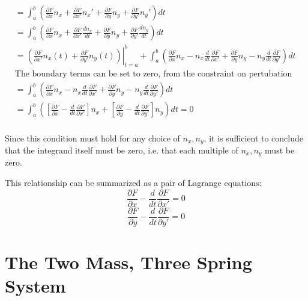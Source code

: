\documentclass[%
 amsmath,amssymb,
aps,
 fleqn,
 notitlepage,
]{revtex4-2}
\begin{document}
\begin{align*}
    &= \int_a^b \left(\frac{\partial F}{\partial x}n_x + \frac{\partial F}{\partial x'}n_x' + \frac{\partial F}{\partial y}n_y + \frac{\partial F}{\partial y'}n_y'\right)dt\\
    &= \int_a^b \left(\frac{\partial F}{\partial x}n_x + \frac{\partial F}{\partial x'}\frac{d n_x}{dt} + \frac{\partial F}{\partial y}n_y + \frac{\partial F}{\partial y'}\frac{d n_y}{dt}\right)dt\\
    &= \left.\left(\frac{\partial F}{\partial x'}n_x(t) + \frac{\partial F}{\partial y'}n_y(t)\right)\right|_{t=a}^b + \int_a^b \left(\frac{\partial F}{\partial x}n_x - n_x\frac{d}{dt}\frac{\partial F}{\partial x'} + \frac{\partial F}{\partial y}n_y - n_y\frac{d}{dt}\frac{\partial F}{\partial y'}\right)dt\\
    &\text{The boundary terms can be set to zero, from the constraint on pertubation vectors:}\\
    &= \int_a^b \left(\frac{\partial F}{\partial x}n_x - n_x\frac{d}{dt}\frac{\partial F}{\partial x'} + \frac{\partial F}{\partial y}n_y - n_y\frac{d}{dt}\frac{\partial F}{\partial y'}\right)dt\\
    &= \int_a^b \left(\left[\frac{\partial F}{\partial x} - \frac{d}{dt}\frac{\partial F}{\partial x'}\right]n_x + \left[\frac{\partial F}{\partial y} - \frac{d}{dt}\frac{\partial F}{\partial y'}\right]n_y\right)dt = 0\\
\end{align*}

Since this condition must hold for any choice of $n_x,n_y$, it is sufficient to conclude that the integrand itself must be zero, i.e. that each multiple of $n_x,n_y$ must be zero.

This relationship can be summarized as a pair of Lagrange equations:
\[\frac{\partial F}{\partial x} - \frac{d}{d t}\frac{\partial F}{\partial x'}=0\]
\[\frac{\partial F}{\partial y} - \frac{d}{d t}\frac{\partial F}{\partial y'}=0\]

\section{The Two Mass, Three Spring System} %
\end{document}
